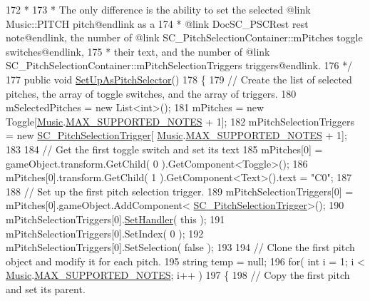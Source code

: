 \begin{DoxyCodeInclude}
172 \textcolor{comment}{     * }
173 \textcolor{comment}{     * The only difference is the ability to set the selected @link Music::PITCH pitch@endlink as a}
174 \textcolor{comment}{     * @link DocSC\_PSCRest rest note@endlink, the number of @link SC\_PitchSelectionContainer::mPitches
       toggle switches@endlink,}
175 \textcolor{comment}{     * their text, and the number of @link SC\_PitchSelectionContainer::mPitchSelectionTriggers
       triggers@endlink.}
176 \textcolor{comment}{    */}
177     \textcolor{keyword}{public} \textcolor{keywordtype}{void} \hyperlink{group___s_c___p_s_c_pub_func_gaf6e9338cfe7202df9787304e49afa24d}{SetUpAsPitchSelector}()
178     \{
179         \textcolor{comment}{// Create the list of selected pitches, the array of toggle switches, and the array of triggers.}
180         mSelectedPitches = \textcolor{keyword}{new} List<int>();
181         mPitches = \textcolor{keyword}{new} Toggle[\hyperlink{class_music}{Music}.\hyperlink{group___music_constants_gaaf07da909a12e9fec0e43b70864f27b7}{MAX\_SUPPORTED\_NOTES} + 1];
182         mPitchSelectionTriggers = \textcolor{keyword}{new} \hyperlink{class_s_c___pitch_selection_trigger}{SC\_PitchSelectionTrigger}[
      \hyperlink{class_music}{Music}.\hyperlink{group___music_constants_gaaf07da909a12e9fec0e43b70864f27b7}{MAX\_SUPPORTED\_NOTES} + 1];
183 
184         \textcolor{comment}{// Get the first toggle switch and set its text}
185         mPitches[0] = gameObject.transform.GetChild( 0 ).GetComponent<Toggle>();
186         mPitches[0].transform.GetChild( 1 ).GetComponent<Text>().text = \textcolor{stringliteral}{"C0"};
187 
188         \textcolor{comment}{// Set up the first pitch selection trigger.}
189         mPitchSelectionTriggers[0] = mPitches[0].gameObject.AddComponent<
      \hyperlink{class_s_c___pitch_selection_trigger}{SC\_PitchSelectionTrigger}>();
190         mPitchSelectionTriggers[0].\hyperlink{group___s_c___p_s_t_pub_func_ga0b334518dbdac5874adf9436cd2c7fed}{SetHandler}( \textcolor{keyword}{this} );
191         mPitchSelectionTriggers[0].SetIndex( 0 );
192         mPitchSelectionTriggers[0].SetSelection( \textcolor{keyword}{false} );
193 
194         \textcolor{comment}{// Clone the first pitch object and modify it for each pitch.}
195         \textcolor{keywordtype}{string} temp = null;
196         \textcolor{keywordflow}{for}( \textcolor{keywordtype}{int} i = 1; i < \hyperlink{class_music}{Music}.\hyperlink{group___music_constants_gaaf07da909a12e9fec0e43b70864f27b7}{MAX\_SUPPORTED\_NOTES}; i++ )
197         \{
198             \textcolor{comment}{// Copy the first pitch and set its parent.}

\end{DoxyCodeInclude}
